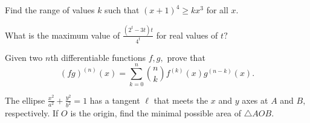 \documentclass{article}
\begin{document}
\begin{prob}[Extension of C10]{2}
Find the range of values $k$ such that $(x+1)^4\geq kx^3$ for all $x.$
\end{prob}

\begin{prob}[AMC 12B 2020/22]{6}
What is the maximum value of $\frac{(2^t-3t)t}{4^t}$ for real values of $t?$
\end{prob}

\begin{req}{6}
Given two $n$th differentiable functions $f,g,$ prove that
\[(fg)^{(n)}(x)=\sum_{k=0}^{n}\binom{n}{k}f^{(k)}(x)g^{(n-k)}(x).\]
\end{req}

\begin{prob}{9}
The ellipse $\frac{x^2}{a^2}+\frac{y^2}{b^2}=1$ has a tangent $\ell$ that meets the $x$ and $y$ axes at $A$ and $B,$ respectively. If $O$ is the origin, find the minimal possible area of $\triangle AOB.$
\end{prob}

\end{document}
